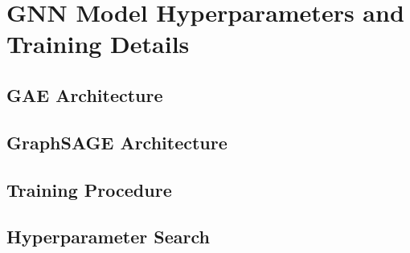 \chapter{GNN Model Hyperparameters and Training Details}
\label{app:hyperparams}


\section{GAE Architecture}
\section{GraphSAGE Architecture}
\section{Training Procedure}
\section{Hyperparameter Search}
